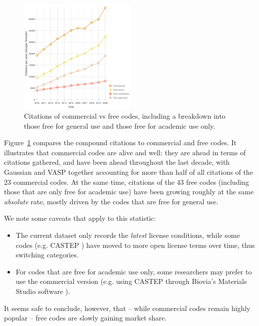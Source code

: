 \documentclass[9pt,review]{livecoms}
\begin{document}
\begin{figure}
    \includegraphics[width=0.5\textwidth]{figures/money}
    \caption{
        Citations of commercial vs free codes, including a breakdown into those free for general use and those free for academic use only.
    }
    \label{fig:money}
\end{figure}


Figure~\ref{fig:money} compares the compound citations to commercial and free codes. 
It illustrates that commercial codes are alive and well:
they are ahead in terms of citations gathered, and have been ahead throughout the last decade, with Gaussian and VASP together accounting for more than half of all citations of the 23 commercial codes. 
At the same time, citations of the 43 free codes (including those that are only free for academic use) have been growing roughly at the same \emph{absolute} rate, mostly driven by the codes that are free for general use.

We note some caveats that apply to this statistic:
\begin{itemize}
    \item 
        The current dataset only records the \emph{latest} license conditions, while some codes (e.g. CASTEP \cite{Clark2005}) have moved to more open license terms over time, thus switching categories.
    \item For codes that are free for academic use only, some researchers may prefer to use the commercial version (e.g. using CASTEP through Biovia's Materials Studio software \cite{Meunier2021}).
\end{itemize}
It seems safe to conclude, however, that -- while commercial codes remain highly popular -- free codes are slowly gaining market share.
\end{document}
